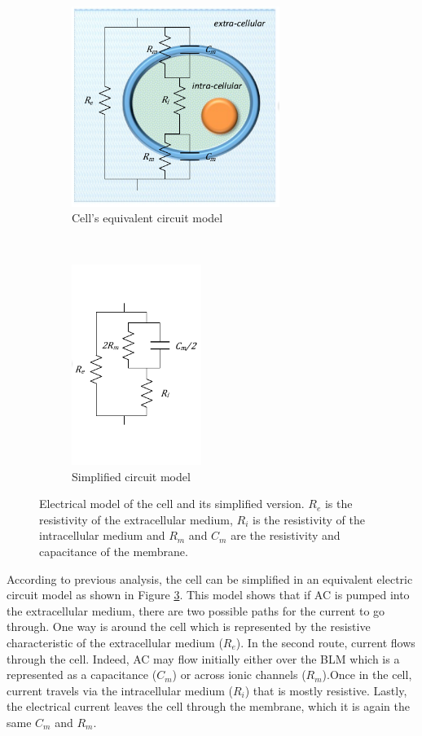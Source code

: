 \begin{figure}[!htbp]
	\centering
	\begin{subfigure}[t]{0.5\textwidth}
		\centering
		\includegraphics[height=6.5cm]{figure2a}
		\caption{Cell's equivalent circuit model}
		\label{fig:cell model}
	\end{subfigure}%
	~ 
	\begin{subfigure}[t]{0.5\textwidth}
		\centering
		\includegraphics[height=6.5cm]{figure2b}
		\caption{Simplified circuit model}
		\label{fig:cell simp model}
	\end{subfigure}
	\caption[Electrical model of the cell]{Electrical model of the cell and its simplified version. $R_e$ is the resistivity of the extracellular medium, $R_i$ is the resistivity of the intracellular medium and $R_m$ and $C_m$ are the resistivity and capacitance of the membrane.}
	\label{fig:cell models}
\end{figure}

According to previous analysis, the cell can be simplified in an equivalent electric circuit model as shown in Figure \ref{fig:cell models}. This model shows that if AC is pumped into the extracellular medium, there are two possible paths for the current to go through. One way is around the cell which is represented by the resistive characteristic of the extracellular medium ($R_e$). In the second route, current flows through the cell. Indeed, AC may flow initially either over the BLM which is a represented as a capacitance ($C_m$) or across ionic channels ($R_m$).Once in the cell, current travels via the intracellular medium ($R_i$) that is mostly resistive. Lastly, the electrical current leaves the cell through the membrane, which it is again the same $C_m$ and $R_m$.

